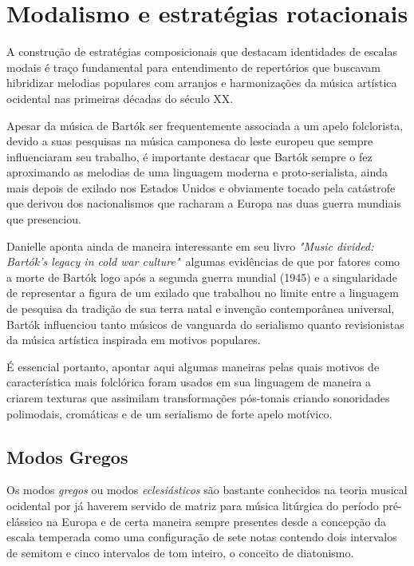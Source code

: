 \documentclass[
	12pt,				%
	openright,			%
	twoside,			%
	a4paper,			%
	english,			%
	french,				%
	spanish,			%
	brazil				%
	]{abntex2}
\begin{document}

\section{Modalismo e estratégias rotacionais}
\label{modalismo}

A construção de estratégias composicionais que destacam identidades de escalas modais é traço fundamental para entendimento de repertórios que buscavam hibridizar melodias populares com arranjos e harmonizações da música artística ocidental nas primeiras décadas do século XX. 

Apesar da música de Bartók ser frequentemente associada a um apelo folclorista, devido a suas pesquisas na música camponesa do leste europeu que sempre influenciaram seu trabalho, é importante destacar que Bartók sempre o fez aproximando as melodias de uma linguagem moderna e proto-serialista, ainda mais depois de exilado nos Estados Unidos e obviamente tocado pela catástrofe que derivou dos nacionalismos que racharam a Europa nas duas guerra mundiais que presenciou.

Danielle  aponta ainda de maneira interessante em seu livro \textit{"Music divided: Bartók's legacy in cold war culture"}\ algumas evidências de que por fatores como a morte de Bartók logo após a segunda guerra mundial (1945) e a singularidade de representar a figura de um exilado que trabalhou no limite entre a linguagem de pesquisa da tradição de sua terra natal e invenção contemporânea universal, Bartók influenciou tanto músicos de vanguarda do serialismo quanto revisionistas da música artística inspirada em motivos populares.

É essencial portanto, apontar aqui algumas maneiras pelas quais motivos de característica mais folclórica foram usados em sua linguagem de maneira a criarem texturas que assimilam transformações pós-tonais criando sonoridades polimodais, cromáticas e de um serialismo de forte apelo motívico.

\subsection{Modos Gregos}

Os modos \textit{gregos} ou modos \textit{eclesiásticos} são bastante conhecidos na teoria musical ocidental por já haverem servido de matriz para música litúrgica do período pré-clássico na Europa e de certa maneira sempre presentes desde a concepção da escala temperada como uma configuração de sete notas contendo dois intervalos de semitom e cinco intervalos de tom inteiro, o conceito de diatonismo. 
\end{document}
